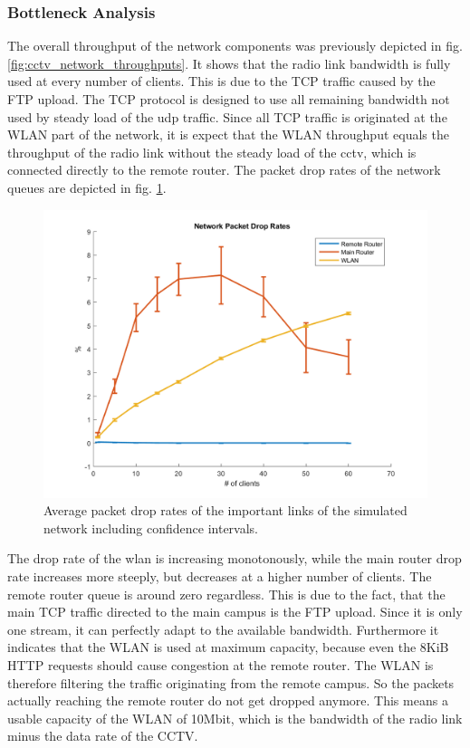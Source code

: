 \documentclass[
10pt, %
a4paper, %
oneside, %
headinclude,footinclude, %
BCOR5mm, %
]{scrartcl}
\begin{document}
\subsubsection{Bottleneck Analysis}
The overall throughput of the network components was previously depicted in fig. \ref{fig:cctv_network_throughputs}. It shows that the radio link bandwidth is fully used at every number of clients. This is due to the TCP traffic caused by the FTP upload. The TCP protocol is designed to use all remaining bandwidth not used by steady load of the udp traffic. Since all TCP traffic is originated at the WLAN part of the network, it is expect that the WLAN throughput equals the throughput of the radio link without the steady load of the cctv, which is connected directly to the remote router.
The packet drop rates of the network queues are depicted in fig. \ref{fig:cctv_netw_packet_drop_rates}.
\begin{figure}[!ht]
  \centering
  \includegraphics[width=\textwidth]{Figures/cctv_network_packet_drop_rates.png}
  \caption{Average packet drop rates of the important links of the simulated network including confidence intervals.} \label{fig:cctv_netw_packet_drop_rates}
\end{figure}
The drop rate of the wlan is increasing monotonously, while the main router drop rate increases more steeply, but decreases at a higher number of clients. The remote router queue is around zero regardless. This is due to the fact, that the main TCP traffic directed to the main campus is the FTP upload. Since it is only one stream, it can perfectly adapt to the available bandwidth. Furthermore it indicates that the WLAN is used at maximum capacity, because even the 8KiB HTTP requests should cause congestion at the remote router. The WLAN is therefore filtering the traffic originating from the remote campus. So the packets actually reaching the remote router do not get dropped anymore. This means a usable capacity of the WLAN of 10Mbit, which is the bandwidth of the radio link minus the data rate of the CCTV.
\end{document}
